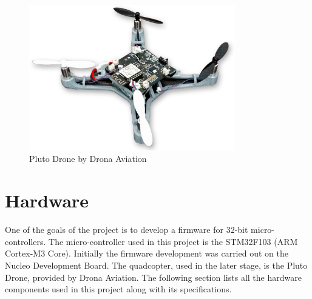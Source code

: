 \documentclass[a4paper,12pt,oneside]{book}
\begin{document}
\begin{figure}[!htb]
\centering
\includegraphics[width=0.8\textwidth]{images/pluto_drone}
\caption{Pluto Drone by Drona Aviation}
\end{figure}


\chapter[Hardware]{Hardware}
One of the goals of the project is to develop a firmware for 32-bit micro-controllers. The micro-controller used in this project is the STM32F103 (ARM Cortex-M3 Core). Initially the firmware development was carried out on the Nucleo Development Board. The quadcopter, used in the later stage, is the Pluto Drone, provided by Drona Aviation. The following section lists all the hardware components used in this project along with its specifications.
\end{document}
